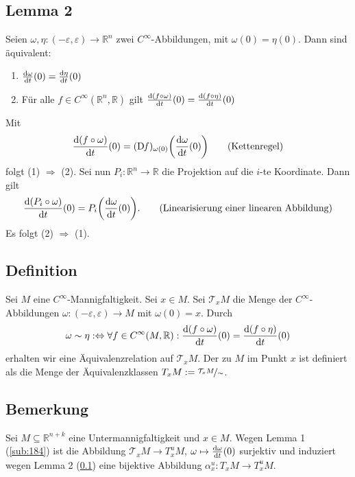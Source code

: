\subsection[Lemma 2: Äquivalenz, die allgemeine Definition von Tangentialvektoren ermöglicht]{Lemma 2} %
\label{sub:185}
Seien $\omega, \eta : (-\varepsilon, \varepsilon) \to \mathds{R}^n$ zwei $C^\infty$-Abbildungen, mit $\omega(0)= \eta(0)$. Dann sind äquivalent:
\begin{enumerate}[(1)]
	\item $\frac{\mathrm{d} \omega}{\mathrm{d} t} (0)= \frac{\mathrm{d} \eta}{\mathrm{d} t} (0)$
	\item Für alle $f \in C^\infty(\mathds{R}^n,\mathds{R})$ gilt $\frac{\mathrm{d} (f \circ \omega)}{\mathrm{d} t} (0) = \frac{\mathrm{d} (f \circ \eta)}{\mathrm{d} t} (0)$
\end{enumerate}
Mit
\begin{align*}
	\diffd{(f \circ \omega)}{t}(0) = (\D f)_{\omega(0)}\enbrace*{\diffd{\omega}{t}(0)}  \tag*{(Kettenregel)}
\end{align*}
folgt (1) $\Rightarrow $ (2). Sei nun $P_i : \mathds{R}^n \to \mathds{R}$ die Projektion auf die $i$-te Koordinate. Dann gilt
\begin{align*}
	\diffd{(P_i \circ \omega)}{t}(0) = P_i \enbrace*{\diffd{\omega}{t}(0)}. \tag*{(Linearisierung einer linearen Abbildung)}
\end{align*}
Es folgt (2) $\Rightarrow $ (1). \bewende

\subsection[Definition: Tangentialraum]{Definition} %
\label{sub:186}
Sei $M$ eine $C^\infty$-Mannigfaltigkeit. Sei $x \in M$. Sei $\mathcal{T}_x M$ die Menge der $C^\infty$-Abbildungen $\omega : (-\varepsilon,\varepsilon) \to M$ mit 
$\omega(0)=x$. Durch
\[
	\omega \sim \eta :\Leftrightarrow \forall f \in C^\infty(M,\mathbb{R}) : \frac{\mathrm{d} (f \circ \omega)}{\mathrm{d} t} (0) = \frac{\mathrm{d} (f \circ \eta)}{\mathrm{d} t} (0)
\]
erhalten wir eine Äquivalenzrelation auf $\mathcal{T}_xM$. Der  zu $M$ im Punkt $x$ ist definiert als die Menge der Äquivalenzklassen 
$T_x M := \nicefrac{\mathcal{T}_x M}{\sim}$.

\subsection[Bemerkung: Die Definition von $T_x^u M$ ist verträglich mit der allgemeinen Definition]{Bemerkung} %
\label{sub:187}
Sei $M \subseteq \mathds{R}^{n+k}$ eine Untermannigfaltigkeit und $x \in M$. Wegen Lemma 1 (\ref{sub:184}) ist die Abbildung $\mathcal{T}_x M  \to T^u_x M$, 
$\omega \mapsto \frac{\mathrm{d} \omega}{\mathrm{d} t} (0)$ surjektiv und induziert wegen Lemma 2 (\ref{sub:185}) eine bijektive Abbildung $\alpha_x^u : T_x M \to T_x^u M$.

